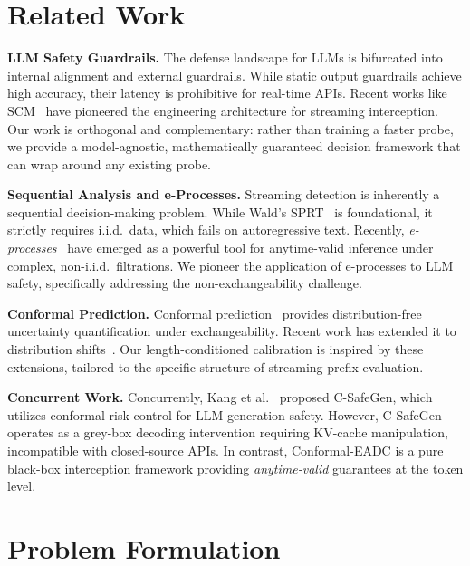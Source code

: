 \documentclass[letterpaper,twocolumn,10pt]{article}
\begin{document}
\section{Related Work}
\label{sec:related}

\textbf{LLM Safety Guardrails.}
The defense landscape for LLMs is bifurcated into internal alignment and external guardrails.
While static output guardrails achieve high accuracy, their latency is prohibitive for real-time APIs.
Recent works like SCM~\cite{scm2024streaming} have pioneered the engineering architecture for streaming interception.
Our work is orthogonal and complementary: rather than training a faster probe, we provide a model-agnostic, mathematically guaranteed decision framework that can wrap around any existing probe.

\textbf{Sequential Analysis and e-Processes.}
Streaming detection is inherently a sequential decision-making problem.
While Wald's SPRT~\cite{wald1945sequential} is foundational, it strictly requires i.i.d.\ data, which fails on autoregressive text.
Recently, \emph{e-processes}~\cite{vovk2021values,ramdas2023game} have emerged as a powerful tool for anytime-valid inference under complex, non-i.i.d.\ filtrations.
We pioneer the application of e-processes to LLM safety, specifically addressing the non-exchangeability challenge.

\textbf{Conformal Prediction.}
Conformal prediction~\cite{vovk2005algorithmic,shafer2008tutorial} provides distribution-free uncertainty quantification under exchangeability.
Recent work has extended it to distribution shifts~\cite{gibbs2021adaptive,tibshirani2019conformal}.
Our length-conditioned calibration is inspired by these extensions, tailored to the specific structure of streaming prefix evaluation.

\textbf{Concurrent Work.}
Concurrently, Kang et al.~\cite{kang2025csafegen} proposed C-SafeGen, which utilizes conformal risk control for LLM generation safety.
However, C-SafeGen operates as a grey-box decoding intervention requiring KV-cache manipulation, incompatible with closed-source APIs.
In contrast, Conformal-EADC is a pure black-box interception framework providing \emph{anytime-valid} guarantees at the token level.

\section{Problem Formulation}
\label{sec:problem}
\end{document}
